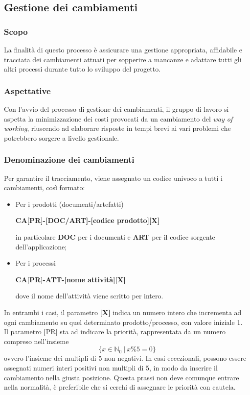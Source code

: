 \subsection{Gestione dei cambiamenti}
\subsubsection{Scopo}
La finalità di questo processo è assicurare una gestione appropriata, affidabile e tracciata
dei cambiamenti attuati per sopperire a mancanze e adattare tutti gli altri processi durante tutto lo sviluppo del progetto.

\subsubsection{Aspettative}
Con l'avvio del processo di gestione dei cambiamenti, il gruppo di lavoro si aspetta la minimizzazione dei costi provocati da un cambiamento
del \textit{way of working}, riuscendo ad elaborare risposte in tempi brevi ai vari problemi che potrebbero sorgere a livello gestionale.

\subsubsection{Denominazione dei cambiamenti}
Per garantire il tracciamento, viene assegnato un codice univoco a tutti i cambiamenti, così formato:
\begin{itemize}
    \item Per i prodotti (documenti/artefatti)
        \begin{center}
            \textbf{CA[PR]-[DOC/ART]-[codice prodotto][X]}
        \end{center}
        in particolare \textbf{DOC} per i documenti e \textbf{ART} per il codice sorgente dell'applicazione;
    \item Per i processi
        \begin{center}
            \textbf{CA[PR]-ATT-[nome attività][X]}
        \end{center}
        dove il nome dell'attività viene scritto per intero.
\end{itemize}
In entrambi i casi, il parametro \textbf{[X]} indica un numero intero che incrementa ad ogni cambiamento su quel determinato prodotto/processo,
 con valore iniziale 1.\\
 Il parametro \textbf[PR] sta ad indicare la priorità, rappresentata da un numero compreso nell'insieme
 \[\{x \in \mathbb{N}_0 \ | \  x \% 5 = 0 \} \]
 ovvero l'insieme dei multipli di 5 non negativi. In casi eccezionali, possono essere assegnati numeri interi positivi non multipli di 5,
 in modo da inserire il cambiamento nella giusta posizione. Questa prassi non deve comunque entrare nella normalità,  è preferibile che si cerchi
 di assegnare le priorità con cautela.

